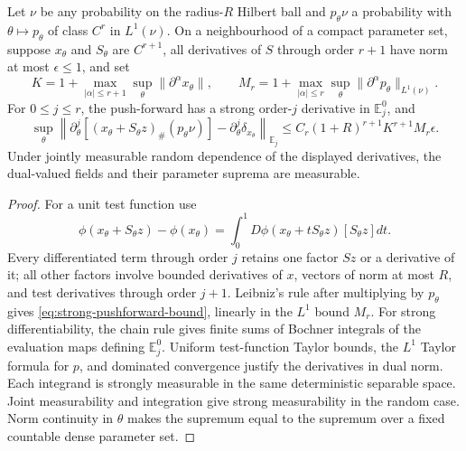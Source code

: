 \begin{lemma}
\label{lem:strong-pushforward}
Let \(\nu\) be any probability on the radius-\(R\) Hilbert ball and
\(p_\theta\nu\) a probability with \(\theta\mapsto p_\theta\) of class
\(C^r\) in \(L^1(\nu)\). On a neighbourhood of a compact parameter set, suppose \(x_\theta\)
and \(S_\theta\) are \(C^{r+1}\), all derivatives of \(S\) through
order \(r+1\) have norm at most \(\epsilon\le1\), and set
\[
 K=1+\max_{|\alpha|\le r+1}\sup_\theta\|\partial^\alpha x_\theta\|,
 \qquad M_r=1+\max_{|\alpha|\le r}\sup_\theta
                  \|\partial^\alpha p_\theta\|_{L^1(\nu)}.
\]
For \(0\le j\le r\), the push-forward has a strong order-\(j\) derivative
in \(\mathbb E_j^0\), and
\begin{equation}
 \sup_\theta\left\|\partial_\theta^j[(x_\theta+S_\theta z)_\#(p_\theta\nu)]
                  -\partial_\theta^j\delta_{x_\theta}\right\|_{\mathbb E_j}
 \le C_r(1+R)^{r+1}K^{r+1}M_r\epsilon.
 \label{eq:strong-pushforward-bound}
\end{equation}
Under jointly measurable random dependence of the displayed derivatives,
the dual-valued fields and their parameter suprema are measurable.
\end{lemma}
\begin{proof}
For a unit test function use
\[
 \phi(x_\theta+S_\theta z)-\phi(x_\theta)
 =\int_0^1D\phi(x_\theta+tS_\theta z)[S_\theta z]dt.
\]
Every differentiated term through order \(j\) retains one factor \(S z\)
or a derivative of it; all other factors involve bounded derivatives of
\(x\), vectors of norm at most \(R\), and test derivatives through
order \(j+1\). Leibniz's rule after multiplying by \(p_\theta\) gives
\eqref{eq:strong-pushforward-bound}, linearly in the \(L^1\) bound \(M_r\).
For strong differentiability, the chain rule gives finite sums of Bochner
integrals of the evaluation maps defining \(\mathbb E_j^0\).
Uniform test-function Taylor bounds, the \(L^1\) Taylor formula for
\(p\), and dominated convergence justify the derivatives in dual norm.
Each integrand is strongly measurable in the same deterministic separable
space. Joint measurability and integration give strong measurability in
the random case. Norm continuity in \(\theta\) makes the supremum equal
to the supremum over a fixed countable dense parameter set.
\end{proof}


